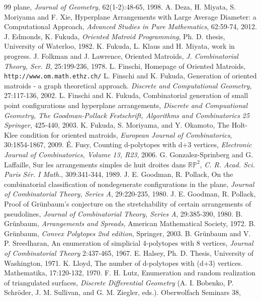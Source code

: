 \documentclass{article}
\begin{document}
\begin{thebibliography}{99}
plane, {\it Journal of  Geometry}, 62(1-2):48-65, 1998.
A. Deza, H. Miyata, S. Moriyama  and F. Xie,
Hyperplane Arrangements with Large Average Diameter: a Computational Approach,
{\it Advanced Studies in Pure Mathematics}, 62:59-74, 2012. 
 J. Edmonds, K. Fukuda, {\it Oriented Matroid Programming}, Ph. D. thesis, University of Waterloo,
1982.
 K. Fukuda, L. Klaus and H. Miyata, work in progress.
 J. Folkman and J. Lawrence, Oriented Matroids, {\it J. Combinatorial Theory, Ser. B}, 25:199-236, 1978.
 L. Finschi, Homepage of Oriented Matroids, 
{\tt http://www.om.math.ethz.ch/}
L. Finschi and K. Fukuda, Generation of oriented matroids - a graph theoretical
approach. {\it Discrete and Computational Geometry}, 27:117-136, 2002.
L. Finschi and K. Fukuda, Combinatorial generation of small point configurations and
hyperplane arrangements, {\it Discrete and Compuational
Geometry, The Goodman-Pollack Festschrift, Algorithms and Combinatorics
25 Springer}, 425-440, 2003.
 K. Fukuda, S. Moriyama, and Y. Okamoto, The Holt-Klee condition for oriented
matroids, {\it European Journal of Combinatorics}, 30:1854-1867, 2009. 
 \'E. Fusy, Counting d-polytopes with d+3 vertices, {\it Electronic Journal of Combinatorics, Volume 13, R23}, 2006.    
 G. Gonzalez-Sprinberg and G. Laffaille, Sur les arrangements
simples de huit droites dans $\mathbb{RP}^2$, {\it C. R. Acad. Sci. Paris S\'er. I
Math.}, 309:341-344, 1989. 
 J. E. Goodman, R. Pollack, On the combinatorial classification of nondegenerate configurations in the plane,
{\it Journal of Combinatorial Theory, Series A}, 29:220-235, 1980. 
 J. E. Goodman, R. Pollack, Proof of Gr\"unbaum's conjecture on the stretchability of certain arrangements of pseudolines,
{\it Journal of Combinatorial Theory, Series A}, 29:385-390, 1980.
 B. Gr\"unbaum, {\it Arrangements and Spreads}, American Mathematical Society, 1972.
  B. Gr\"unbaum, {\it Convex Polytopes 2nd edition}, Springer, 2003. 
 B. Gr\"unbaum and V. P. Sreedharan, An enumeration of simplicial 4-polytopes with 8 vertices, {\it Journal of Combinatorial Theory} 
2:437-465, 1967. 
 E. Halsey, Ph. D. Thesis, University of Washington, 1971.
 K. Lloyd, The number of d-polytopes with (d+3) vertices. Mathematika, 17:120-132, 1970.
 F. H. Lutz, Enumeration and random realization of triangulated surfaces, 
{\it Discrete Differential Geometry} (A. I. Bobenko, P. Schr\"oder, J. M. Sullivan, and G. M. Ziegler, eds.). Oberwolfach Seminars 38,

\end{thebibliography}
\end{document}

